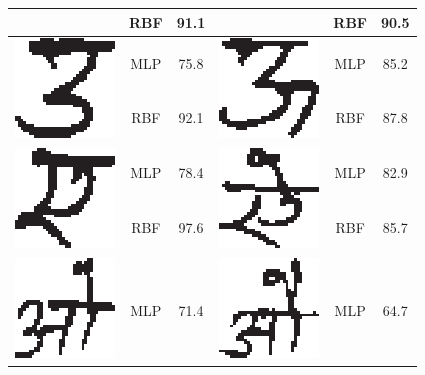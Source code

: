 \begin{table}[h]
\begin{tabular}{|c|c|c|c|c|c|}
\cline{2-3} \cline{5-6}
 & RBF & 91.1 &  & RBF & 90.5\tabularnewline
\hline
\multirow{2}{*}{\includegraphics[scale=0.25]{figures/datasets/nhcr/vowels/5u}} & MLP & 75.8 & \multirow{2}{*}{\includegraphics[scale=0.25]{figures/datasets/nhcr/vowels/6oo}} & MLP & 85.2\tabularnewline
\cline{2-3} \cline{5-6}
 & RBF & 92.1 &  & RBF & 87.8\tabularnewline
\hline
\multirow{2}{*}{\includegraphics[scale=0.25]{figures/datasets/nhcr/vowels/7ye}} & MLP & 78.4 & \multirow{2}{*}{\includegraphics[scale=0.25]{figures/datasets/nhcr/vowels/8ai}} & MLP & 82.9\tabularnewline
\cline{2-3} \cline{5-6}
 & RBF & 97.6 &  & RBF & 85.7\tabularnewline
\hline
\multirow{2}{*}{\includegraphics[scale=0.25]{figures/datasets/nhcr/vowels/9o}} & MLP & 71.4 & \multirow{2}{*}{\includegraphics[scale=0.25]{figures/datasets/nhcr/vowels/10au}} & MLP & 64.7\tabularnewline

\end{tabular}
\end{table}
